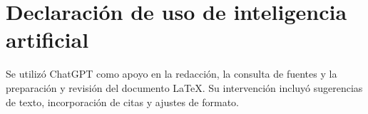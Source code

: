 \section*{Declaración de uso de inteligencia artificial}
Se utilizó ChatGPT como apoyo en la redacción, la consulta de fuentes y la
preparación y revisión del documento LaTeX. Su intervención incluyó sugerencias
de texto, incorporación de citas y ajustes de formato.
